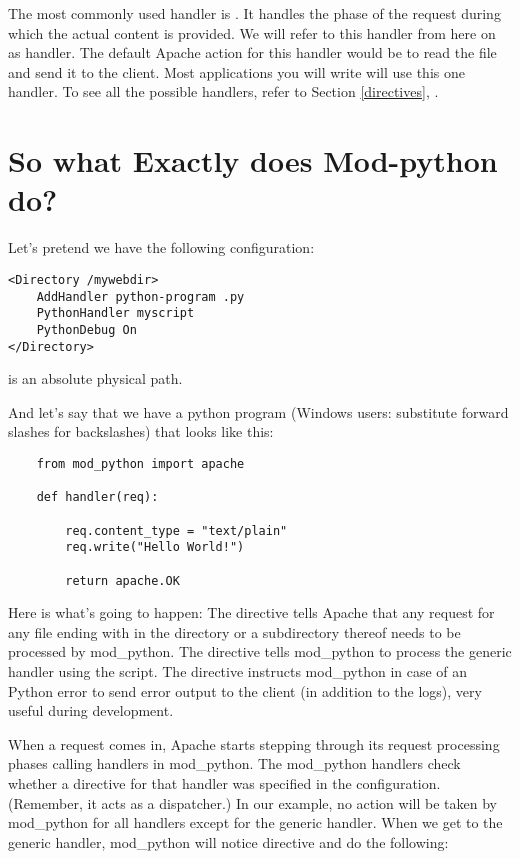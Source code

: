  The most commonly used handler is
. It handles the phase of the request during which
the actual content is provided. We will refer to this handler from
here on as  handler. The default Apache action for this
handler would be to read the file and send it to the client. Most
applications you will write will use this one handler. To see all the
possible handlers, refer to Section \ref{directives},
.

\section{So what Exactly does Mod-python do?\label{tut-what-it-do}}

Let's pretend we have the following configuration: 
\begin{verbatim}
<Directory /mywebdir>
    AddHandler python-program .py
    PythonHandler myscript
    PythonDebug On
</Directory>
\end{verbatim}

  is an absolute physical path. 

And let's say that we have a python program (Windows users: substitute
forward slashes for backslashes)  that looks like
this:

\begin{verbatim}
    from mod_python import apache

    def handler(req):

        req.content_type = "text/plain"
        req.write("Hello World!")

        return apache.OK
\end{verbatim}    

Here is what's going to happen: The  directive tells
Apache that any request for any file ending with  in the
 directory or a subdirectory thereof needs to be
processed by mod_python. The  directive
tells mod_python to process the generic handler using the
 script. The  directive instructs
mod_python in case of an Python error to send error output to the
client (in addition to the logs), very useful during development.

When a request comes in, Apache starts stepping through its
request processing phases calling handlers in mod_python. The
mod_python handlers check whether a directive for that handler was
specified in the configuration. (Remember, it acts as a dispatcher.)
In our example, no action will be taken by mod_python for
all handlers except for the generic handler. When we get to the
generic handler, mod_python will notice  directive and do the following:


